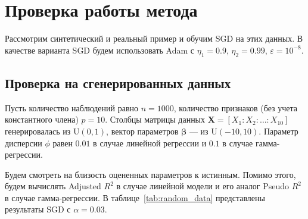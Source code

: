 \documentclass[a4paper]{article}
\begin{document}
\section{Проверка работы метода}
Рассмотрим синтетический и реальный пример и обучим \textsf{SGD} на этих данных. В качестве варианта \textsf{SGD} будем использовать Adam с $\eta_1=0.9$, $\eta_2=0.99$, $\varepsilon=10^{-8}$.
\subsection{Проверка на сгенерированных данных}
Пусть количество наблюдений равно $n=1000$, количество признаков (без учета константного члена) $p=10$. Столбцы матрицы данных $\mathbf{X}=[X_1:X_2:\ldots:X_{10}]$ генерировалась из $\mathrm{U}(0, 1)$, вектор параметров $\bm\beta$ --- из $\mathrm{U}(-10, 10)$. Параметр дисперсии $\phi$ равен $0.01$ в случае линейной регрессии и $0.1$ в случае гамма-регрессии.

Будем смотреть на близость оцененных параметров к истинным. Помимо этого, будем вычислять Adjusted $R^2$ в случае линейной модели и его аналог Pseudo $R^2$ в случае гамма-регрессии. В таблице~\ref{tab:random_data} представлены результаты \textsf{SGD} с $\alpha=0.03$.
\end{document}
